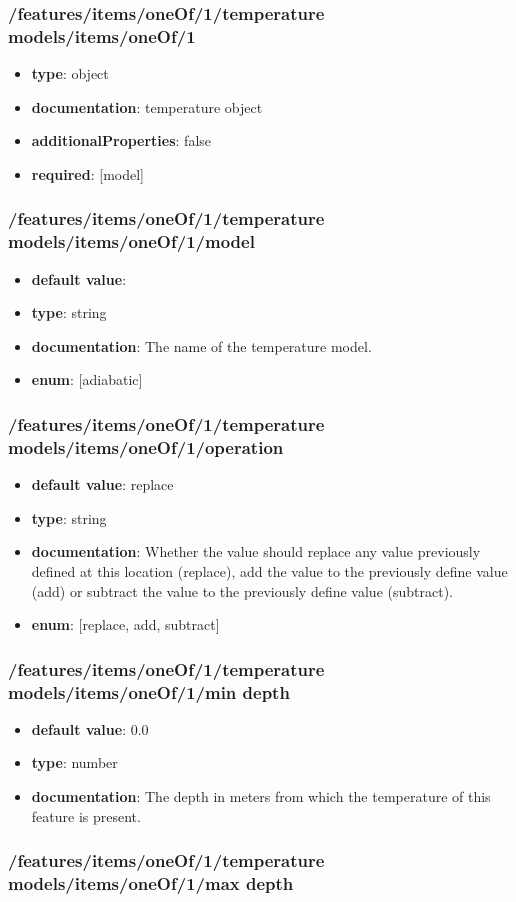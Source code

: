 \subsubsection{/features/items/oneOf/1/temperature models/items/oneOf/1}
\begin{itemize}\item {\bf type}: object
\item {\bf documentation}: temperature object
\item {\bf additionalProperties}: false
\item {\bf required}: [model]\end{itemize}
\subsubsection{/features/items/oneOf/1/temperature models/items/oneOf/1/model}
\begin{itemize}\item {\bf default value}: 
\item {\bf type}: string
\item {\bf documentation}: The name of the temperature model.
\item {\bf enum}: [adiabatic]\end{itemize}\subsubsection{/features/items/oneOf/1/temperature models/items/oneOf/1/operation}
\begin{itemize}\item {\bf default value}: replace
\item {\bf type}: string
\item {\bf documentation}: Whether the value should replace any value previously defined at this location (replace), add the value to the previously define value (add) or subtract the value to the previously define value (subtract).
\item {\bf enum}: [replace, add, subtract]\end{itemize}\subsubsection{/features/items/oneOf/1/temperature models/items/oneOf/1/min depth}
\begin{itemize}\item {\bf default value}: 0.0
\item {\bf type}: number
\item {\bf documentation}: The depth in meters from which the temperature of this feature is present.
\end{itemize}\subsubsection{/features/items/oneOf/1/temperature models/items/oneOf/1/max depth}
